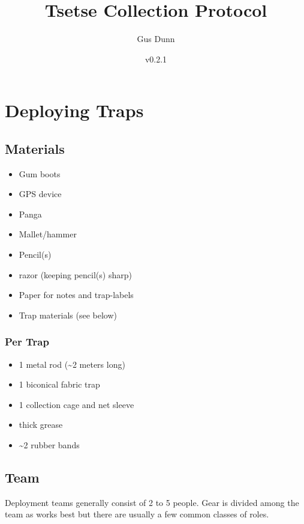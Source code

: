 \documentclass[letterpaper]{scrreprt}
\title{Tsetse Collection Protocol\\\vspace{0.5em}{\large Core Procedures}}
\author{Gus Dunn}
\date{v0.2.1}
\begin{document}
\maketitle

{
\hypersetup{linkcolor=black}
\setcounter{tocdepth}{2}
\tableofcontents
}
\chapter{Deploying Traps}\label{deploying-traps}

\section{Materials}\label{materials}

\begin{itemize}
\itemsep1pt\parskip0pt
\item
  Gum boots
\item
  GPS device
\item
  Panga
\item
  Mallet/hammer
\item
  Pencil(s)
\item
  razor (keeping pencil(s) sharp)
\item
  Paper for notes and trap-labels
\item
  Trap materials (see below)
\end{itemize}

\subsection{Per Trap}\label{per-trap}

\begin{itemize}
\itemsep1pt\parskip0pt
\item
  1 metal rod (\textasciitilde{}2 meters long)
\item
  1 biconical fabric trap
\item
  1 collection cage and net sleeve
\item
  thick grease
\item
  \textasciitilde{}2 rubber bands
\end{itemize}

\section{Team}\label{team}

Deployment teams generally consist of 2 to 5 people. Gear is divided
among the team as works best but there are usually a few common classes
of roles.
\end{document}
